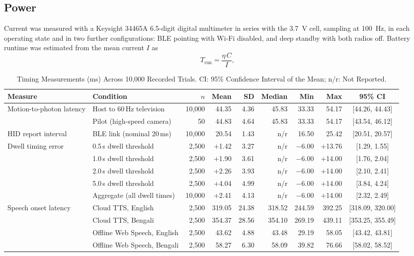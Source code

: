 \documentclass[journal]{IEEEtran}
\begin{document}
\subsection{Power}
Current was measured with a Keysight 34465A 6.5-digit digital multimeter in series with the 3.7~V cell, sampling at 100~Hz, in each operating state and in two further configurations: BLE pointing with Wi-Fi disabled, and deep standby with both radios off. Battery runtime was estimated from the mean current $I$ as
\begin{equation}
T_{\mathrm{run}}=\frac{\eta\,C}{I},
\label{eq:runtime}
\end{equation}
\begin{table}[!t]
\caption{Timing Measurements (ms) Across 10,000 Recorded Trials. CI: 95\% Confidence Interval of the Mean; n/r: Not Reported.}
\label{tab:timing}
\centering
\footnotesize
\setlength{\tabcolsep}{5pt}
\begin{tabular}{@{}llrrrrrrc@{}}
\toprule
Measure & Condition & $n$ & Mean & SD & Median & Min & Max & 95\% CI \\
\midrule
Motion-to-photon latency & Host to 60\,Hz television & 10,000 & 44.35 & 4.36 & 45.83 & 33.33 & 54.17 & [44.26, 44.43] \\
 & Pilot (high-speed camera) & 50 & 44.83 & 4.64 & 45.83 & 33.33 & 54.17 & [43.54, 46.12] \\
HID report interval & BLE link (nominal 20\,ms) & 10,000 & 20.54 & 1.43 & n/r & 16.50 & 25.42 & [20.51, 20.57] \\
\addlinespace
Dwell timing error & 0.5\,s dwell threshold & 2,500 & $+$1.42 & 3.27 & n/r & $-$6.00 & $+$13.76 & [1.29, 1.55] \\
 & 1.0\,s dwell threshold & 2,500 & $+$1.90 & 3.61 & n/r & $-$6.00 & $+$14.00 & [1.76, 2.04] \\
 & 2.0\,s dwell threshold & 2,500 & $+$2.26 & 3.93 & n/r & $-$6.00 & $+$14.00 & [2.10, 2.41] \\
 & 5.0\,s dwell threshold & 2,500 & $+$4.04 & 4.99 & n/r & $-$6.00 & $+$14.00 & [3.84, 4.24] \\
 & Aggregate (all dwell times) & 10,000 & $+$2.41 & 4.13 & n/r & $-$6.00 & $+$14.00 & [2.32, 2.49] \\
\addlinespace
Speech onset latency & Cloud TTS, English & 2,500 & 319.05 & 24.38 & 318.52 & 244.59 & 392.25 & [318.09, 320.00] \\
 & Cloud TTS, Bengali & 2,500 & 354.37 & 28.56 & 354.10 & 269.19 & 439.11 & [353.25, 355.49] \\
 & Offline Web Speech, English & 2,500 & 43.62 & 4.88 & 43.48 & 29.19 & 58.05 & [43.42, 43.81] \\
 & Offline Web Speech, Bengali & 2,500 & 58.27 & 6.30 & 58.09 & 39.82 & 76.66 & [58.02, 58.52] \\
\bottomrule
\end{tabular}
\end{table}
\end{document}
